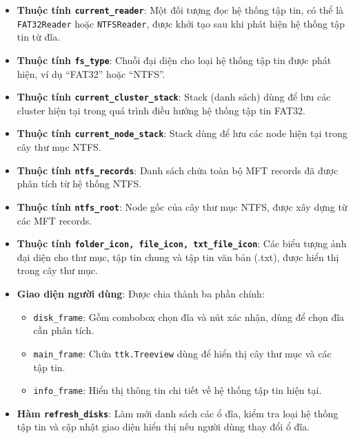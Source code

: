 \begin{itemize}
    \item \textbf{Thuộc tính \texttt{current\_reader}}: Một đối tượng đọc hệ thống tập tin, có thể là \texttt{FAT32Reader} hoặc \texttt{NTFSReader}, được khởi tạo sau khi phát hiện hệ thống tập tin từ đĩa.

    \item \textbf{Thuộc tính \texttt{fs\_type}}: Chuỗi đại diện cho loại hệ thống tập tin được phát hiện, ví dụ ``FAT32'' hoặc ``NTFS''.

    \item \textbf{Thuộc tính \texttt{current\_cluster\_stack}}: Stack (danh sách) dùng để lưu các cluster hiện tại trong quá trình điều hướng hệ thống tập tin FAT32.

    \item \textbf{Thuộc tính \texttt{current\_node\_stack}}: Stack dùng để lưu các node hiện tại trong cây thư mục NTFS.

    \item \textbf{Thuộc tính \texttt{ntfs\_records}}: Danh sách chứa toàn bộ MFT records đã được phân tích từ hệ thống NTFS.

    \item \textbf{Thuộc tính \texttt{ntfs\_root}}: Node gốc của cây thư mục NTFS, được xây dựng từ các MFT records.

    \item \textbf{Thuộc tính \texttt{folder\_icon, file\_icon, txt\_file\_icon}}: Các biểu tượng ảnh đại diện cho thư mục, tập tin chung và tập tin văn bản (.txt), được hiển thị trong cây thư mục.

    \item \textbf{Giao diện người dùng}: Được chia thành ba phần chính:
    \begin{itemize}
        \item \texttt{disk\_frame}: Gồm combobox chọn đĩa và nút xác nhận, dùng để chọn đĩa cần phân tích.
        \item \texttt{main\_frame}: Chứa \texttt{ttk.Treeview} dùng để hiển thị cây thư mục và các tập tin.
        \item \texttt{info\_frame}: Hiển thị thông tin chi tiết về hệ thống tập tin hiện tại.
    \end{itemize}

    \item \textbf{Hàm \texttt{refresh\_disks}}: Làm mới danh sách các ổ đĩa, kiểm tra loại hệ thống tập tin và cập nhật giao diện hiển thị nếu người dùng thay đổi ổ đĩa.


\end{itemize}
